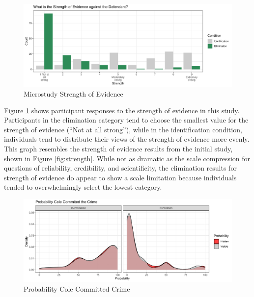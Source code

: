 \documentclass[print]{nuthesis}
\begin{document}
\begin{figure}

{\centering \includegraphics[width=\linewidth]{thesis_files/figure-latex/strength2-1} 

}

\caption{Microstudy Strength of Evidence}\label{fig:strength2}
\end{figure}

Figure \ref{fig:strength2} shows participant responses to the strength of evidence in this study.
Participants in the elimination category tend to choose the smallest value for the strength of evidence (``Not at all strong''), while in the identification condition, individuals tend to distribute their views of the strength of evidence more evenly.
This graph resembles the strength of evidence results from the initial study, shown in Figure \ref{fig:strength}.
While not as dramatic as the scale compression for questions of reliability, credibility, and scientificity, the elimination results for strength of evidence do appear to show a scale limitation because individuals tended to overwhelmingly select the lowest category.

\begin{figure}

{\centering \includegraphics[width=\linewidth]{thesis_files/figure-latex/prob2-1} 

}

\caption{Probability Cole Committed Crime}\label{fig:prob2}
\end{figure}
\end{document}
